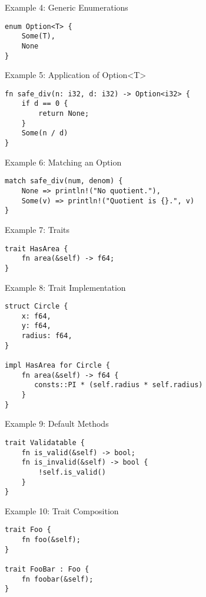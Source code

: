 
\begin{frame}[fragile]{Example 4: Generic Enumerations}
\begin{verbatim}
enum Option<T> {
    Some(T),
    None
}
\end{verbatim}
\end{frame}


\begin{frame}[fragile]{Example 5: Application of Option<T>}
\begin{verbatim}
fn safe_div(n: i32, d: i32) -> Option<i32> {
    if d == 0 {
        return None;
    }
    Some(n / d)
}
\end{verbatim}
\end{frame}


\begin{frame}[fragile]{Example 6: Matching an Option}
\begin{verbatim}
match safe_div(num, denom) {
    None => println!("No quotient."),
    Some(v) => println!("Quotient is {}.", v)
}
\end{verbatim}
\end{frame}


\begin{frame}[fragile]{Example 7: Traits}
\begin{verbatim}
trait HasArea {
    fn area(&self) -> f64;
}
\end{verbatim}
\end{frame}


\begin{frame}[fragile]{Example 8: Trait Implementation}
\begin{verbatim}
struct Circle {
    x: f64,
    y: f64,
    radius: f64,
}

impl HasArea for Circle {
    fn area(&self) -> f64 {
       consts::PI * (self.radius * self.radius)
    }
}
\end{verbatim}
\end{frame}


\begin{frame}[fragile]{Example 9: Default Methods}
\begin{verbatim}
trait Validatable {
    fn is_valid(&self) -> bool;
    fn is_invalid(&self) -> bool {
        !self.is_valid()
    }
}
\end{verbatim}
\end{frame}


\begin{frame}[fragile]{Example 10: Trait Composition}
\begin{verbatim}
trait Foo {
    fn foo(&self);
}

trait FooBar : Foo {
    fn foobar(&self);
}
\end{verbatim}
\end{frame}
